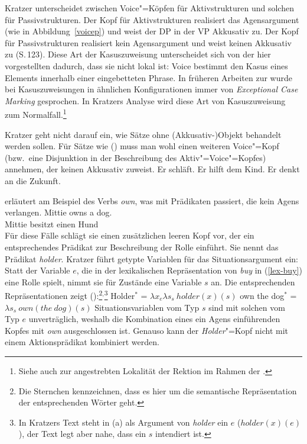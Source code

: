{Kratzer unterscheidet
zwischen Voice"=Köpfen für Aktivstrukturen und solchen für Passivstrukturen. Der Kopf
für Aktivstrukturen realisiert das Agensargument (wie in Abbildung~\ref{voicep}) und
weist der DP in der VP Akkusativ zu. Der Kopf für Passivstrukturen realisiert
kein Agensargument und weist keinen Akkusativ zu (S.\,123). Diese Art der Kasuszuweisung
unterscheidet sich von der hier vorgestellten dadurch, dass sie nicht lokal ist: Voice
bestimmt den Kasus eines Elements innerhalb einer eingebetteten Phrase. In früheren
Arbeiten zur \gb wurde bei Kasuszuweisungen in ähnlichen Konfigurationen immer von
\emph{Exceptional Case Marking} gesprochen. In Kratzers Analyse wird diese Art von
Kasuszuweisung zum Normalfall.\footnote{
  Siehe auch  zur angestrebten Lokalität der Rektion im Rahmen der \gbt.
}

Kratzer geht nicht darauf ein, wie Sätze ohne (Akkusativ-)Objekt behandelt werden sollen. Für
Sätze wie () muss man wohl einen weiteren Voice"=Kopf (bzw.\ eine Disjunktion
in der Beschreibung des Aktiv"=Voice"=Kopfes) annehmen, der keinen Akkusativ zuweist.
\eal
\ex Er schläft.
\ex Er hilft dem Kind.
\ex Er denkt an die Zukunft.
\zl

\noindent
\citet[]{Kratzer96a} erläutert am Beispiel des Verbs \emph{own}, was mit Prädikaten passiert,
die kein Agens verlangen.
\ea
\gll Mittie owns a dog.\\
     Mittie besitzt einen Hund\\
\z
Für diese Fälle schlägt sie einen zusätzlichen leeren Kopf vor, der ein entsprechendes
Prädikat zur Beschreibung der Rolle einführt. Sie nennt das Prädikat \emph{holder}.
Kratzer führt getypte Variablen für das Situationsargument ein: Statt der Variable
$e$, die in der lexikalischen Repräsentation von \emph{buy} in (\ref{lex-buy}) eine Rolle
spielt, nimmt sie für Zustände eine Variable $s$ an. Die entsprechenden Repräsentationen
zeigt ():\footnote{
  Die Sternchen kennzeichnen, dass es hier um die semantische Repräsentation der entsprechenden
  Wörter geht.}$^,$\footnote{
  In Kratzers Text steht in (a) als Argument von \emph{holder} ein $e$ ($holder(x)(e)$),
  der Text legt aber nahe, dass ein $s$ intendiert ist.%
} 
\eal
\ex Holder$^*$ = $\lambda x_e \lambda s_s~holder(x)(s)$
\ex own the dog$^*$ = $\lambda s_s~own(the~dog)(s)$
\zl
Situationsvariablen vom Typ $s$ sind mit solchen vom Typ $e$ unverträglich, weshalb
die Kombination eines ein Agens einführenden Kopfes mit \emph{own} ausgeschlossen ist.
Genauso kann der \emph{Holder}"=Kopf nicht mit einem Aktionsprädikat kombiniert werden.

}
